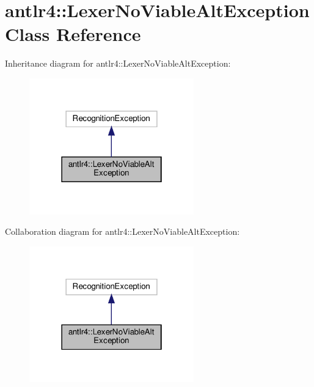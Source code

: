 \hypertarget{classantlr4_1_1LexerNoViableAltException}{}\section{antlr4\+:\+:Lexer\+No\+Viable\+Alt\+Exception Class Reference}
\label{classantlr4_1_1LexerNoViableAltException}


Inheritance diagram for antlr4\+:\+:Lexer\+No\+Viable\+Alt\+Exception\+:
\nopagebreak
\begin{figure}[H]
\begin{center}
\leavevmode
\includegraphics[width=202pt]{classantlr4_1_1LexerNoViableAltException__inherit__graph}
\end{center}
\end{figure}


Collaboration diagram for antlr4\+:\+:Lexer\+No\+Viable\+Alt\+Exception\+:
\nopagebreak
\begin{figure}[H]
\begin{center}
\leavevmode
\includegraphics[width=202pt]{classantlr4_1_1LexerNoViableAltException__coll__graph}
\end{center}
\end{figure}
